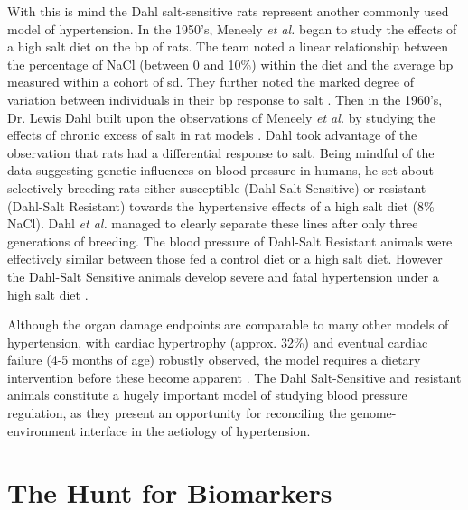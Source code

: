 With this is mind the Dahl salt-sensitive rats represent another commonly used model of hypertension. In the 1950's, Meneely \textit{et al.} began to study the effects of a high salt diet on the \acrshort{bp} of rats. The team noted a linear relationship between the percentage of NaCl (between 0 and 10\%) within the diet and the average \acrshort{bp} measured within a cohort of \acrfull{sd}. They further noted the marked degree of variation between individuals in their \acrshort{bp} response to salt \cite{MENEELY1958}. Then in the 1960's, Dr. Lewis Dahl built upon the observations of Meneely \textit{et al.} by studying the effects of chronic excess of salt in rat models \cite{DAHL1961}. Dahl took advantage of the observation that rats had a differential response to salt. Being mindful of the data suggesting genetic influences on blood pressure in humans, he set about selectively breeding rats either susceptible (Dahl-Salt Sensitive) or resistant (Dahl-Salt Resistant) towards the hypertensive effects of a high salt diet (8\% NaCl). Dahl \textit{et al.} managed to clearly separate these lines after only three generations of breeding. The blood pressure of Dahl-Salt Resistant animals were effectively similar between those fed a control diet or a high salt diet. However the Dahl-Salt Sensitive animals develop severe and fatal hypertension under a high salt diet \cite{DAHL1962,DAHL1962a}. 

Although the organ damage endpoints are comparable to many other models of hypertension, with cardiac hypertrophy (approx. 32\%) and eventual cardiac failure (4-5 months of age) robustly observed, the model requires a dietary intervention before these become apparent \cite{Pinto1998}. The Dahl Salt-Sensitive and resistant animals constitute a hugely important model of studying blood pressure regulation, as they present an opportunity for reconciling the genome-environment interface in the aetiology of hypertension.

\section{The Hunt for Biomarkers}

